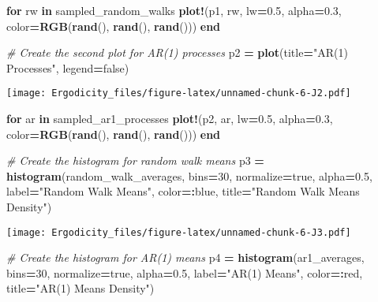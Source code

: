 \documentclass[
]{article}
\newenvironment{Shaded}{\begin{snugshade}}{\end{snugshade}}
\newcommand{\CommentTok}[1]{\textcolor[rgb]{0.56,0.35,0.01}{\textit{#1}}}
\newcommand{\ConstantTok}[1]{\textcolor[rgb]{0.56,0.35,0.01}{#1}}
\newcommand{\ControlFlowTok}[1]{\textcolor[rgb]{0.13,0.29,0.53}{\textbf{#1}}}
\newcommand{\FloatTok}[1]{\textcolor[rgb]{0.00,0.00,0.81}{#1}}
\newcommand{\FunctionTok}[1]{\textcolor[rgb]{0.13,0.29,0.53}{\textbf{#1}}}
\newcommand{\KeywordTok}[1]{\textcolor[rgb]{0.13,0.29,0.53}{\textbf{#1}}}
\newcommand{\NormalTok}[1]{#1}
\newcommand{\OperatorTok}[1]{\textcolor[rgb]{0.81,0.36,0.00}{\textbf{#1}}}
\newcommand{\StringTok}[1]{\textcolor[rgb]{0.31,0.60,0.02}{#1}}
\begin{document}
\begin{Shaded}
\begin{Highlighting}[]
\ControlFlowTok{for}\NormalTok{ rw }\KeywordTok{in}\NormalTok{ sampled\_random\_walks}
    \FunctionTok{plot!}\NormalTok{(p1, rw, lw}\OperatorTok{=}\FloatTok{0.5}\NormalTok{, alpha}\OperatorTok{=}\FloatTok{0.3}\NormalTok{, color}\OperatorTok{=}\FunctionTok{RGB}\NormalTok{(}\FunctionTok{rand}\NormalTok{(), }\FunctionTok{rand}\NormalTok{(), }\FunctionTok{rand}\NormalTok{()))}
\ControlFlowTok{end}

\CommentTok{\# Create the second plot for AR(1) processes}
\NormalTok{p2 }\OperatorTok{=} \FunctionTok{plot}\NormalTok{(title}\OperatorTok{=}\StringTok{"AR(1) Processes"}\NormalTok{, legend}\OperatorTok{=}\ConstantTok{false}\NormalTok{)}
\end{Highlighting}
\end{Shaded}

\texttt{[image: Ergodicity\_files/figure-latex/unnamed-chunk-6-J2.pdf]}

\begin{Shaded}
\begin{Highlighting}[]
\ControlFlowTok{for}\NormalTok{ ar }\KeywordTok{in}\NormalTok{ sampled\_ar1\_processes}
    \FunctionTok{plot!}\NormalTok{(p2, ar, lw}\OperatorTok{=}\FloatTok{0.5}\NormalTok{, alpha}\OperatorTok{=}\FloatTok{0.3}\NormalTok{, color}\OperatorTok{=}\FunctionTok{RGB}\NormalTok{(}\FunctionTok{rand}\NormalTok{(), }\FunctionTok{rand}\NormalTok{(), }\FunctionTok{rand}\NormalTok{()))}
\ControlFlowTok{end}

\CommentTok{\# Create the histogram for random walk means}
\NormalTok{p3 }\OperatorTok{=} \FunctionTok{histogram}\NormalTok{(random\_walk\_averages, bins}\OperatorTok{=}\FloatTok{30}\NormalTok{, normalize}\OperatorTok{=}\ConstantTok{true}\NormalTok{, alpha}\OperatorTok{=}\FloatTok{0.5}\NormalTok{,}
\NormalTok{               label}\OperatorTok{=}\StringTok{"Random Walk Means"}\NormalTok{, color}\OperatorTok{=:}\NormalTok{blue, title}\OperatorTok{=}\StringTok{"Random Walk Means Density"}\NormalTok{)}
\end{Highlighting}
\end{Shaded}

\texttt{[image: Ergodicity\_files/figure-latex/unnamed-chunk-6-J3.pdf]}

\begin{Shaded}
\begin{Highlighting}[]

\CommentTok{\# Create the histogram for AR(1) means}
\NormalTok{p4 }\OperatorTok{=} \FunctionTok{histogram}\NormalTok{(ar1\_averages, bins}\OperatorTok{=}\FloatTok{30}\NormalTok{, normalize}\OperatorTok{=}\ConstantTok{true}\NormalTok{, alpha}\OperatorTok{=}\FloatTok{0.5}\NormalTok{,}
\NormalTok{               label}\OperatorTok{=}\StringTok{"AR(1) Means"}\NormalTok{, color}\OperatorTok{=:}\NormalTok{red, title}\OperatorTok{=}\StringTok{"AR(1) Means Density"}\NormalTok{)}
\end{Highlighting}
\end{Shaded}
\end{document}
